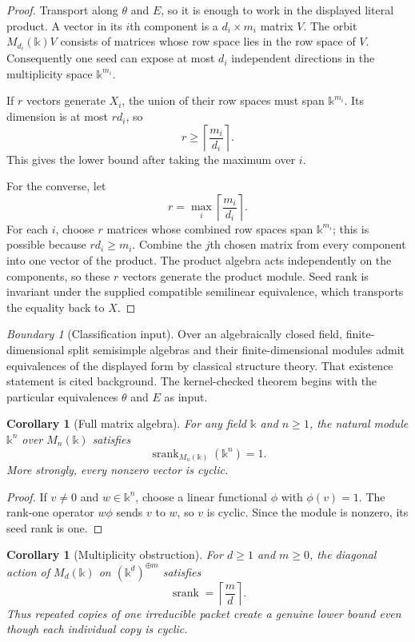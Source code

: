 \documentclass[11pt]{article}
\newtheorem{corollary}[theorem]{Corollary}
\theoremstyle{definition}
\theoremstyle{remark}
\newtheorem{boundary}[theorem]{Boundary}
\newcommand{\srank}{\operatorname{srank}}
\newcommand{\bbk}{\mathbb{k}}
\begin{document}
\begin{proof}
Transport along $\theta$ and $E$, so it is enough to work in the displayed literal product. A vector in its $i$th component is a $d_i\times m_i$ matrix $V$. The orbit $M_{d_i}(\bbk)V$ consists of matrices whose row space lies in the row space of $V$. Consequently one seed can expose at most $d_i$ independent directions in the multiplicity space $\bbk^{m_i}$.

If $r$ vectors generate $X_i$, the union of their row spaces must span $\bbk^{m_i}$. Its dimension is at most $rd_i$, so
\[
r\ge\left\lceil\frac{m_i}{d_i}\right\rceil.
\]
This gives the lower bound after taking the maximum over $i$.

For the converse, let
\[
r=\max_i\left\lceil\frac{m_i}{d_i}\right\rceil.
\]
For each $i$, choose $r$ matrices whose combined row spaces span $\bbk^{m_i}$; this is possible because $rd_i\ge m_i$. Combine the $j$th chosen matrix from every component into one vector of the product. The product algebra acts independently on the components, so these $r$ vectors generate the product module. Seed rank is invariant under the supplied compatible semilinear equivalence, which transports the equality back to $X$.
\end{proof}

\begin{boundary}[Classification input]
Over an algebraically closed field, finite-dimensional split semisimple algebras and their finite-dimensional modules admit equivalences of the displayed form by classical structure theory. That existence statement is cited background. The kernel-checked theorem begins with the particular equivalences $\theta$ and $E$ as input.
\end{boundary}

\begin{corollary}[Full matrix algebra]
\label{cor:full-matrix}
For any field $\bbk$ and $n\ge1$, the natural module $\bbk^n$ over $M_n(\bbk)$ satisfies
\[
\srank_{M_n(\bbk)}(\bbk^n)=1.
\]
More strongly, every nonzero vector is cyclic.
\end{corollary}

\begin{proof}
If $v\ne0$ and $w\in\bbk^n$, choose a linear functional $\phi$ with $\phi(v)=1$. The rank-one operator $w\phi$ sends $v$ to $w$, so $v$ is cyclic. Since the module is nonzero, its seed rank is one.
\end{proof}

\begin{corollary}[Multiplicity obstruction]
\label{cor:multiplicity-obstruction}
For $d\ge1$ and $m\ge0$, the diagonal action of $M_d(\bbk)$ on $(\bbk^d)^{\oplus m}$ satisfies
\[
\srank=\left\lceil\frac md\right\rceil.
\]
Thus repeated copies of one irreducible packet create a genuine lower bound even though each individual copy is cyclic.
\end{corollary}
\end{document}
